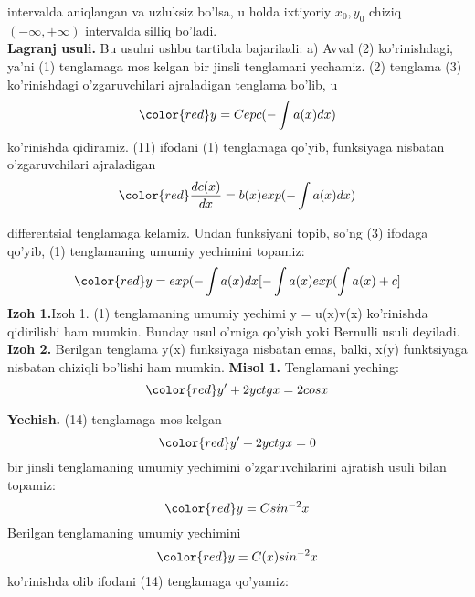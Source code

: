 \documentclass{beamer}
\begin{document}

\begin{frame}
\quad intervalda aniqlangan va uzluksiz bo’lsa, u holda ixtiyoriy $x_{0},y_{0}$ chiziq $(-\infty,+\infty)$ intervalda silliq bo’ladi.\\
\quad\textbf{Lagranj usuli.} Bu usulni ushbu tartibda bajariladi: a) Avval (2) ko’rinishdagi, ya’ni (1) tenglamaga mos kelgan bir jinsli tenglamani yechamiz. (2) tenglama (3) ko’rinishdagi o’zgaruvchilari ajraladigan tenglama bo’lib, u
\begin{equation}
\color{red} y = C epc(-\int a(x)dx)
\end{equation}
ko’rinishda qidiramiz. (11) ifodani (1) tenglamaga qo’yib, funksiyaga nisbatan o’zgaruvchilari ajraladigan
\\
\begin{equation}
\color{red} \dfrac{dc(x)}{dx}=b(x)exp(-\int a(x)dx)
\end{equation}
\end{frame}

\begin{frame}
differentsial tenglamaga kelamiz. Undan funksiyani topib, so’ng (3) ifodaga qo’yib, (1) tenglamaning umumiy yechimini topamiz:
\begin{equation}
\color{red} y = exp(-\int a(x)dx\lbrack{-}\int a(x)exp(\int a(x)+c\rbrack
\end{equation}
\textbf{Izoh 1.}Izoh 1. (1) tenglamaning umumiy yechimi y = u(x)v(x) ko’rinishda qidirilishi ham mumkin. Bunday usul o’rniga qo’yish yoki Bernulli usuli deyiladi.
\textbf{Izoh 2.} Berilgan tenglama y(x) funksiyaga nisbatan emas, balki, x(y) funktsiyaga nisbatan chiziqli bo’lishi ham mumkin.
\textbf{Misol 1.} Tenglamani yeching:
\begin{equation}
\color{red} y'+ 2y ctgx = 2cosx
\end{equation}

\end{frame}


\begin{frame}
\quad \textbf{Yechish.} (14) tenglamaga mos kelgan 
\begin{equation}
\color{red} y' + 2yctgx = 0
\end{equation}
bir jinsli tenglamaning umumiy yechimini o’zgaruvchilarini ajratish usuli bilan topamiz:
\begin{equation}
\color{red} y = Csin^{-2}x
\end{equation}
Berilgan tenglamaning umumiy yechimini\\
\begin{equation}
\color{red} y = C(x)sin^{-2}x
\end{equation}
ko’rinishda olib ifodani (14) tenglamaga qo’yamiz:
\end{frame}
\end{document}
